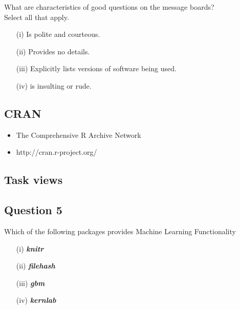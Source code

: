 \documentclass[12pt]{article}
\begin{document}
 
What are characteristics of good questions on the message boards? \\ Select all that apply.
 

\begin{itemize}

\item[(i)] Is polite and courteous. 

\item[(ii)] Provides no details. 

\item[(iii)] Explicitly lists versions of software being used. 

\item[(iv)] is insulting or rude. 
\end{itemize}


\newpage
\subsection*{CRAN}
\begin{itemize}
\item The Comprehensive R Archive Network
\item http://cran.r-project.org/
\end{itemize}
\subsection*{Task views}


\newpage
\subsection*{Question 5}

Which of the following packages provides Machine Learning Functionality
\begin{itemize}
\item[(i)] \textbf{\textit{knitr}}
\item[(ii)] \textbf{\textit{filehash}}
\item[(iii)] \textbf{\textit{gbm}}
\item[(iv)] \textbf{\textit{kernlab}}
\end{itemize}

\newpage
\end{document}
